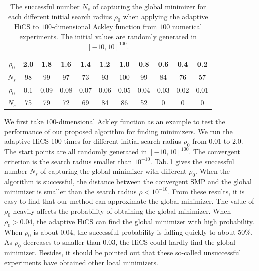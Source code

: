 \documentclass[mathpazo]{csam}
\theoremstyle{remark}
\begin{document}
\begin{table}[!hbpt]
\caption{
The successful number $N_s$ of capturing the global minimizer for
each different initial search radius $\rho_0$ when applying the
adaptive HiCS to $100$-dimensional Ackley function from $100$ numerical experiments. 
The initial values are randomly generated in $[-10,10]^{100}$.
}
\label{tab:ackley100D:AHiCS}
\begin{center}
\begin{tabular}{|c|c|c|c|c|c|c|c|c|c|c|}
 \hline
  $\rho_0$  & 2.0 & 1.8 & 1.6 & 1.4 & 1.2 & 1.0 & 0.8 & 0.6 & 0.4 & 0.2 
 \\\hline
  $N_s$     & 98  & 99  & 97  & 73  & 93  & 100 & 99  & 84  & 76 & 57 
\\\hline \hline
 $\rho_0$ & 0.1 & 0.09 & 0.08 & 0.07 & 0.06 & 0.05 & 0.04 & 0.03& 0.02 & 0.01
 \\\hline
  $N_s$& 75 & 79 & 72 & 69 & 84 &86 & 52 & 0 & 0 & 0
\\ \hline
\end{tabular}
\end{center}
\end{table}
We first take $100$-dimensional Ackley function as an example to
test the performance of our proposed algorithm for finding minimizers. 
We run the adaptive HiCS 100 times for different initial
search radius $\rho_0$ from $0.01$ to $2.0$.
The start points are all randomly generated in $[-10,10]^{100}$.
The convergent criterion is the search radius smaller than $10^{-10}$.
Tab.\,\ref{tab:ackley100D:AHiCS} gives the successful number
$N_s$ of capturing the global minimizer with different $\rho_0$.  
When the algorithm is successful, the distance between the
convergent SMP and the global minimizer is smaller than the
search radius $\rho < 10^{-10}$.
From these results, it is easy to find that our method can
approximate the global minimizer. 
The value of $\rho_0$ heavily affects the probability of
obtaining the global minimizer. 
When $\rho_0 > 0.04$, the adaptive HiCS can find the global
minimizer with high probability. 
When $\rho_0$ is about $0.04$, 
the successful probability is falling quickly to about $50\%$. 
As $\rho_0$ decreases to smaller than $0.03$, the HiCS could hardly
find the global minimizer.
Besides, it should be pointed out that these so-called unsuccessful
experiments have obtained other local minimizers. 
\end{document}
